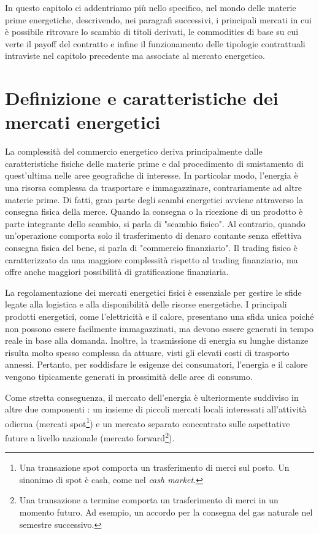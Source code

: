 \documentclass[12pt,a4paper]{report}
\begin{document}
In questo capitolo ci addentriamo più nello specifico, nel mondo delle materie prime energetiche, descrivendo, nei paragrafi successivi, i principali mercati in cui è possibile ritrovare lo scambio di titoli derivati, le commodities di base su cui verte il payoff del contratto e infine il funzionamento delle tipologie contrattuali intraviste nel capitolo precedente ma associate al mercato energetico.


\section{Definizione e caratteristiche dei mercati energetici}


La complessità del commercio energetico deriva principalmente dalle caratteristiche fisiche delle materie prime e dal procedimento di smistamento di quest'ultima nelle aree geografiche di interesse. In particolar modo, l'energia è una risorsa complessa da trasportare e immagazzinare, contrariamente ad altre materie prime. Di fatti, gran parte degli scambi energetici avviene attraverso la consegna fisica della merce. Quando la consegna o la ricezione di un prodotto è parte integrante dello scambio, si parla di "scambio fisico". Al contrario, quando un'operazione comporta solo il trasferimento di denaro contante senza effettiva consegna fisica del bene, si parla di "commercio finanziario". Il trading fisico è caratterizzato da una maggiore complessità rispetto al trading finanziario, ma offre anche maggiori possibilità di gratificazione finanziaria.

La regolamentazione dei mercati energetici fisici è essenziale per gestire le sfide legate alla logistica e alla disponibilità delle risorse energetiche.
I principali prodotti energetici, come l'elettricità e il calore, presentano una sfida unica poiché non possono essere facilmente immagazzinati, ma devono essere generati in tempo reale in base alla domanda. Inoltre, la trasmissione di energia su lunghe distanze risulta molto spesso complessa da attuare, visti gli elevati costi di trasporto annessi. Pertanto, per soddisfare le esigenze dei consumatori, l'energia e il calore vengono tipicamente generati in prossimità delle aree di consumo.

Come stretta conseguenza, il mercato dell'energia è ulteriormente suddiviso in altre due componenti : un insieme di piccoli mercati locali interessati all'attività odierna (mercati spot\footnote{Una transazione spot comporta un trasferimento di merci sul posto. Un sinonimo di spot è cash, come nel \textit{cash market}.}) e un mercato separato concentrato sulle aspettative future a livello nazionale (mercato forward\footnote{Una transazione a termine comporta un trasferimento di merci in un momento futuro. Ad esempio, un accordo per la consegna del gas naturale nel semestre successivo.}).
\end{document}
